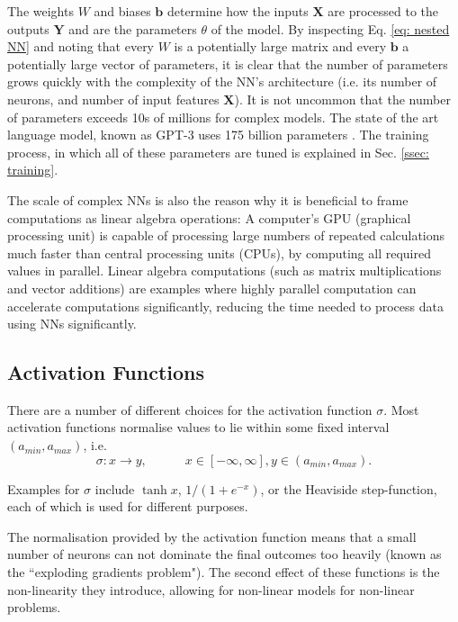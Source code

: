         The weights $W$ and biases $\mathbf{b}$ determine how the inputs $\mathbf{X}$ are processed to the outputs $\mathbf{Y}$ and are the parameters $\theta$ of the model. By inspecting Eq. \ref{eq: nested NN} and noting that every $W$ is a potentially large matrix and every $\mathbf{b}$ a potentially large vector of parameters, it is clear that the number of parameters grows quickly with the complexity of the NN's architecture (i.e. its number of neurons, and number of input features $\mathbf{X}$). It is not uncommon that the number of parameters exceeds 10s of millions for complex models. The state of the art language model, known as GPT-3 uses 175 billion parameters \cite{gpt3}. The training process, in which all of these parameters are tuned is explained in Sec. \ref{ssec: training}.
        
        The scale of complex NNs is also the reason why it is beneficial to frame computations as linear algebra operations: A computer's GPU (graphical processing unit) is capable of processing large numbers of repeated calculations much faster than central processing units (CPUs), by computing all required values in parallel\cite{herlihy2012art}. 
        Linear algebra computations (such as matrix multiplications and vector additions) are examples where highly parallel computation can accelerate computations significantly, reducing the time needed to process data using NNs significantly.\cite{herlihy2012art}
        
        \subsection{Activation Functions \label{ssec: activation function}}
    
        There are a number of different choices for the activation function $\sigma$. Most activation functions normalise values to lie within some fixed interval $(a_{min}, a_{max})$, i.e.
        \begin{equation}
        \sigma : x \rightarrow y, \hspace{3em} x \in [-\infty, \infty], y \in (a_{min}, a_{max}).
        \end{equation}
        
        Examples for $\sigma$ include $\tanh{x}$, $1/(1 + e^{-x})$, or the Heaviside step-function, each of which is used for different purposes.
        
        The normalisation provided by the activation function means that a small number of neurons can not dominate the final outcomes too heavily (known as the ``exploding gradients problem"). The second effect of these functions is the non-linearity they introduce, allowing for non-linear models for non-linear problems.
        
